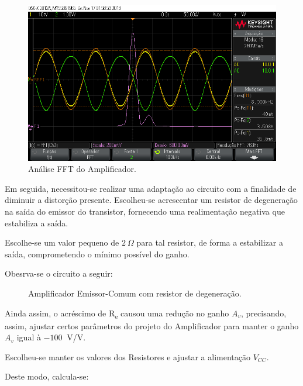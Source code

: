 \documentclass[journal, a4paper]{IEEEtran}
\begin{document}
         \begin{figure}[H]
    		\begin{center}
    		\includegraphics[width=\columnwidth]{osciloscopio_distorcao_fft.png}
    		\caption{Análise FFT do Amplificador.}
    		\label{osciloscopio fft}
    		\end{center}
    	\end{figure}
    
    \tab Em seguida, necessitou-se realizar uma adaptação ao circuito com a finalidade de diminuir a distorção presente. Escolheu-se acrescentar um resistor de degeneração na saída do emissor do transistor, fornecendo uma realimentação negativa que estabiliza a saída. 
    
    \tab Escolhe-se um valor pequeno de $2 \: \Omega$ para tal resistor, de forma a estabilizar a saída, comprometendo o mínimo possível do ganho.
    
    \tab Obesrva-se o circuito a seguir: 
        \begin{figure}[H]
        \hspace{-0.8cm}
        
        
	    \caption{Amplificador Emissor-Comum com resistor de degeneração.}
        \label{EM com re}
    \end{figure}
    
    \tab Ainda assim, o acréscimo de R\textsubscript{e} causou uma redução no ganho $A_v$, precisando, assim, ajustar certos parâmetros do projeto do Amplificador para manter o ganho $A_v$ igual à $-100 \:$ V/V.
    
    \tab Escolheu-se manter os valores dos Resistores e ajustar a alimentação $V_{CC}$.
    
    \tab Deste modo, calcula-se: 
    
\end{document}
